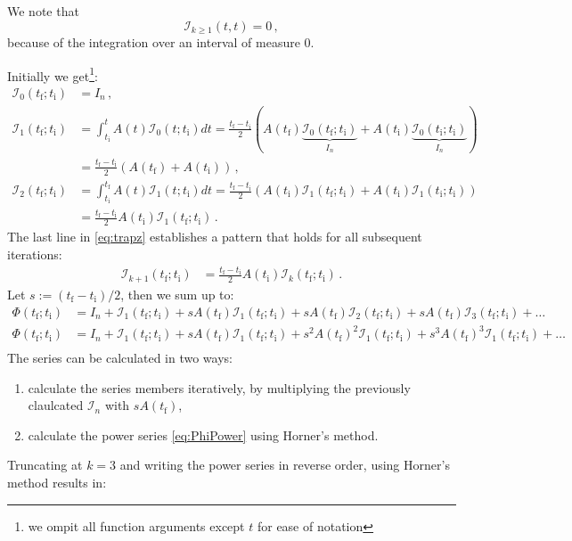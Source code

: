 \documentclass[utf8,english,DIV=12]{scrartcl}
\newcommand{\ti}{\ensuremath{t_{\text{i}}}}
\newcommand{\tf}{\ensuremath{t_{\text{f}}}}
\newcommand{\I}{\ensuremath{\mathcal{I}}}
\newcommand{\eye}[1]{\ensuremath{I_{#1}}}
\begin{document}
We note that
\begin{equation}
  \label{eq:I123}
  \I_{k\ge 1}(t,t)=0\,,
\end{equation}
because of the integration over an interval of measure $0$.

Initially we get\footnote{we ompit all function arguments except $t$ for ease of notation}:
\begin{equation}
  \label{eq:trapz}
  \begin{split}
    \I_0(\tf;\ti)&=\eye{n}\,,\\
    \I_1(\tf;\ti)&=\int_{\ti}^{t}A(t) \I_0(t;\ti) dt=\frac{\tf-\ti}{2} \left(A(\tf) \underbrace{\I_0(\tf;\ti)}_{\eye{n}} + A(\ti) \underbrace{\I_0(\ti;\ti)}_{\eye{n}}\right)\\
    &=\frac{\tf-\ti}{2} \left(A(\tf) + A(\ti)\right)\,,\\
    \I_2(\tf;\ti) &= \int_{\ti}^{\tf}A(t) \I_1(t;\ti)dt = \frac{\tf-\ti}{2}\left(A(\ti) \I_1(\tf;\ti) + A(\ti) \I_1(\ti;\ti) \right)\\
    &=\frac{\tf-\ti}{2}A(\ti) \I_1(\tf;\ti)\,.
  \end{split}
\end{equation}
The last line in \eqref{eq:trapz} establishes a pattern that holds for all subsequent iterations:
\begin{equation}
  \label{eq:pattern}
  \begin{split}
    \I_{k+1}(\tf;\ti) &= \frac{\tf-\ti}{2}A(\ti) \I_k(\tf;\ti)\,.
  \end{split}
\end{equation}
Let $s:=(\tf-\ti)/2$, then we sum up to:
\begin{align}
  \Phi(\tf;\ti)&=\eye{n} + \I_1(\tf;\ti) + s A(\tf)\I_1(\tf;\ti) + s A(\tf)
                 \I_2(\tf;\ti) +s A(\tf)\I_3(\tf;\ti) + \dots   \label{eq:PhiIteration}\\
    \Phi(\tf;\ti)&=\eye{n} + \I_1(\tf;\ti) + s A(\tf)\I_1(\tf;\ti) + s^2 A(\tf)^2 \I_1(\tf;\ti) + s^3 A(\tf)^3 \I_1(\tf;\ti) +\dots   \label{eq:PhiPower}\\
\end{align}
The series can be calculated in two ways:
\begin{enumerate}
\item calculate the series members iteratively, by multiplying the previously claulcated $\I_n$ with $s A(\tf)$,
\item calculate the power series \eqref{eq:PhiPower} using Horner's method.
\end{enumerate}
Truncating at $k=3$ and writing the power series in reverse order, using Horner's method results in:
\end{document}
